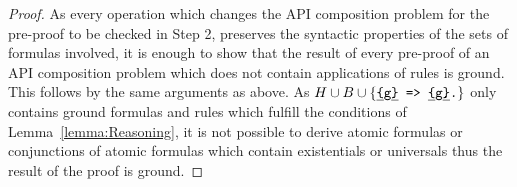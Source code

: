 \begin{proof}
As every operation which changes the API composition problem for the pre-proof to be checked in Step 2, preserves the syntactic properties of the 
sets of formulas involved, it is enough to show that the result of every pre-proof of an API composition problem which does not contain 
applications of \restdesc rules is ground. %
This follows by the same arguments as above. As $H\cup B \cup \{ \texttt{\underline{\{}g\underline{\}} => \underline{\{}g\underline{\}}.}\}$ 
only contains ground formulas and rules which fulfill
the conditions of Lemma~\ref{lemma:Reasoning},
it is not possible to derive atomic formulas or conjunctions of atomic formulas which contain existentials or universals %
thus the result of the proof is ground.
% 
% 
% 
% 
\end{proof}

